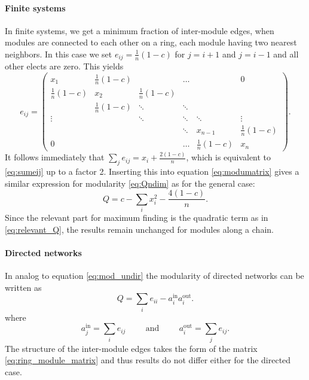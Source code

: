 \paragraph{Finite systems\color{Cayenne}{.}}
In finite systems, we get a minimum fraction of inter-module edges, when modules are connected to each other on a ring, each module having two nearest neighbors.
In this case we set  $e_{ij}= \frac{1}{n}(1-c)$ for $j=i+1$ and $j=i-1$ and all other elects are zero.
This yields
\begin{equation}\label{eq:ring_module_matrix}
e_{ij}=\left(\begin{array}{cccccc}
x_1 & \frac{1}{n}(1-c)&  & \hdots &  & 0 \\ 
\frac{1}{n}(1-c)& x_2 &\frac{1}{n}(1-c)&  &  &  \\
 & \frac{1}{n}(1-c) & \ddots & \ddots & & \\
\vdots &  & \ddots & \ddots & \ddots &\vdots \\
 & & & \ddots   &  x_{n-1} &\frac{1}{n}(1-c) \\
0 & &  & \hdots & \frac{1}{n}(1-c) & x_n
\end{array}
\right) .
\end{equation}
It follows immediately that $\sum _j e_{ij}=x_i+\frac{2(1-c)}{n}$, which is equivalent to \eqref{eq:sumeij} up to a factor 2.
Inserting this into equation \eqref{eq:modumatrix} gives a similar expression for modularity \eqref{eq:Qndim} as for the general case:
\begin{equation*}
Q=c-\sum _i x_i^2 - \frac{4(1-c)}{n} .
\end{equation*}
Since the relevant part for maximum finding is the quadratic term as in \eqref{eq:relevant_Q}, the results remain unchanged for modules along a chain.

\paragraph{Directed networks\color{Cayenne}{.}}
In analog to equation \eqref{eq:mod_undir} the modularity of directed networks can be written as \citep{Kao:2007}
\begin{equation}\label{eq:mod_directed}
Q=\sum _i e_{ii} - a_i ^{\text{in}} a_i ^{\text{out}}.
\end{equation}
where
\[
a_j ^\text{in}= \sum _i e_{ij} \hspace{1cm} \text{and} \hspace{1cm} a_i ^\text{out}= \sum _j e_{ij}.
\]
The structure of the inter-module edges takes the form of the matrix \eqref{eq:ring_module_matrix} and thus results do not differ either for the directed case.






%
%
%
%
%
